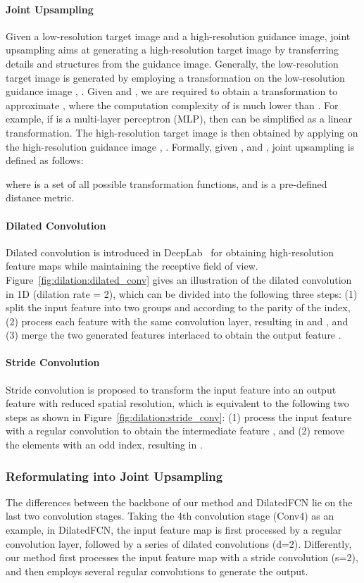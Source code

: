 \documentclass[10pt,twocolumn,letterpaper]{article}
\begin{document}
\paragraph{Joint Upsampling}
Given a low-resolution target image and a high-resolution guidance image, joint upsampling aims at generating a high-resolution target image by transferring details and structures from the guidance image.
Generally, the low-resolution target image  is generated by employing a transformation  on the low-resolution guidance image , \ie .
Given  and , we are required to obtain a transformation  to approximate , where the computation complexity of  is much lower than .
For example, if  is a multi-layer perceptron (MLP), then  can be simplified as a linear transformation.
The high-resolution target image  is then obtained by applying  on the high-resolution guidance image , \ie .
Formally, given ,  and , joint upsampling is defined as follows:

where  is a set of all possible transformation functions, and  is a pre-defined distance metric.
\vspace{-1em}
\paragraph{Dilated Convolution}
Dilated convolution is introduced in DeepLab~\cite{chen2018deeplab} for obtaining high-resolution feature maps while maintaining the receptive field of view.
Figure~\ref{fig:dilation:dilated_conv} gives an illustration of the dilated convolution in 1D (dilation rate = 2), which can be divided into the following three steps:
(1) split the input feature  into two groups  and  according to the parity of the index,
(2) process each feature with the same convolution layer, resulting in  and ,
and (3) merge the two generated features interlaced to obtain the output feature .
\vspace{-1em}
\paragraph{Stride Convolution}
Stride convolution is proposed to transform the input feature into an output feature with reduced spatial resolution, which is equivalent to the following two steps as shown in Figure~\ref{fig:dilation:stride_conv}:
(1) process the input feature  with a regular convolution to obtain the intermediate feature ,
and (2) remove the elements with an odd index, resulting in .

\subsubsection{Reformulating into Joint Upsampling}
\quad The differences between the backbone of our method and DilatedFCN lie on the last two convolution stages.
Taking the 4th convolution stage (Conv4) as an example, in DilatedFCN, the input feature map is first processed by a regular convolution layer, followed by a series of dilated convolutions (d=2).
Differently, our method first processes the input feature map with a stride convolution (s=2), and then employs several regular convolutions to generate the output.
\end{document}
